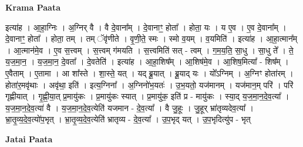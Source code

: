 \documentclass[17pt]{extarticle}
\begin{document}
\textbf{Krama Paata} \newline

इत्या॑ह । आ॒हा॒ग्निः । अ॒ग्निर् वै । वै दे॒वाना᳚म् । दे॒वानाꣳ॒॒ होता᳚ । होता॒ यः । य ए॒व । ए॒व दे॒वाना᳚म् । दे॒वानाꣳ॒॒ होता᳚ । होता॒ तम् । तम् ॅवृ॑णीते । वृ॒णी॒ते॒ स्मः । स्मो व॒यम् । व॒यमिति॑ । इत्या॑ह । आ॒हा॒त्मान᳚म् । आ॒त्मान॑मे॒व । ए॒व स॒त्त्वम् । स॒त्त्वम् ग॑मयति । स॒त्त्वमिति॑ सत् - त्वम् । ग॒म॒य॒ति॒ सा॒धु । सा॒धु ते᳚ । ते॒ य॒ज॒मा॒न॒ । य॒ज॒मा॒न॒ दे॒वता᳚ । दे॒वतेति॑ । इत्या॑ह । आ॒हा॒शिष᳚म् । आ॒शिष॑मे॒व । आ॒शिष॒मित्या᳚ - शिष᳚म् । ए॒वैताम् । ए॒तामा । आ शा᳚स्ते । शा॒स्ते॒ यत् । यद् ब्रू॒यात् । ब्रू॒याद् यः । यो᳚ऽग्निम् । अ॒ग्निꣳ होता॑रम् । होता॑र॒मवृ॑थाः । अवृ॑था॒ इति॑ । इत्य॒ग्निना᳚ । अ॒ग्निनो॑भ॒यतः॑ । उ॒भ॒यतो॒ यज॑मानम् । यज॑मान॒म् परि॑ । परि॑ गृह्णीयात् । गृ॒ह्णी॒या॒त् प्र॒मायु॑कः । प्र॒मायु॑कः स्यात् । प्र॒मायु॑क॒ इति॑ प्र - मायु॑कः । स्या॒द् य॒ज॒मा॒न॒दे॒व॒त्या᳚ । य॒ज॒मा॒न॒दे॒व॒त्या॑ वै । य॒ज॒मा॒न॒दे॒व॒त्येति॑ यजमान - दे॒व॒त्या᳚ । वै जु॒हूः । जु॒हूर् भ्रा॑तृव्यदेव॒त्या᳚ । भ्रा॒तृ॒व्य॒दे॒व॒त्यो॑प॒भृत् । भ्रा॒तृ॒व्य॒दे॒व॒त्येति॑ भ्रातृव्य - दे॒व॒त्या᳚ । उ॒प॒भृद् यत् । उ॒प॒भृदित्यु॑प - भृत् \newline

\textbf{Jatai Paata} \newline
\end{document}
